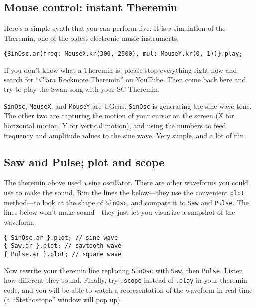 \subsection{Mouse control: instant Theremin}

Here's a simple synth that you can perform live. It is a simulation of the Theremin, one of the oldest electronic music instruments:

\begin{lstlisting}[style=SuperCollider-IDE, basicstyle=\scttfamily\footnotesize]
{SinOsc.ar(freq: MouseX.kr(300, 2500), mul: MouseY.kr(0, 1))}.play;
\end{lstlisting}

If you don't know what a Theremin is, please stop everything right now and search for ``Clara Rockmore Theremin'' ou YouTube. Then come back here and try to play the Swan song with your SC Theremin.

\texttt{SinOsc}, \texttt{MouseX}, and \texttt{MouseY} are UGens. \texttt{SinOsc} is generating the sine wave tone. The other two are capturing the motion of your cursor on the screen (X for horizontal motion, Y for vertical motion), and using the numbers to feed frequency and amplitude values to the sine wave. Very simple, and a lot of fun.

\subsection{Saw and Pulse; plot and scope}

The theremin above used a sine oscillator. There are other waveforms you could use to make the sound. Run the lines the below---they use the convenient \texttt{plot} method---to look at the shape of \texttt{SinOsc}, and compare it to \texttt{Saw} and \texttt{Pulse}. The lines below won't make sound---they just let you visualize a snapshot of the waveform. 

\begin{lstlisting}[style=SuperCollider-IDE, basicstyle=\scttfamily\footnotesize]
{ SinOsc.ar }.plot; // sine wave
{ Saw.ar }.plot; // sawtooth wave
{ Pulse.ar }.plot; // square wave
\end{lstlisting}

Now rewrite your theremin line replacing \texttt{SinOsc} with \texttt{Saw}, then \texttt{Pulse}. Listen how different they sound. Finally, try \texttt{.scope} instead of \texttt{.play} in your theremin code, and you will be able to watch a representation of the waveform in real time (a ``Stethoscope'' window will pop up).
